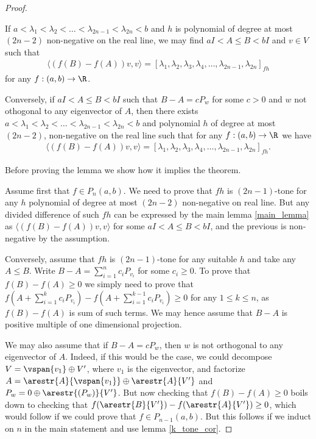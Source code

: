 \begin{proof}
	\begin{lem}\label{main_lemma}
		If $a < \lambda_{1} < \lambda_{2} < \ldots < \lambda_{2 n - 1} < \lambda_{2 n} < b$ and $h$ is polynomial of degree at most $(2 n - 2)$ non-negative on the real line, we may find $a I < A \leq  B < b I$ and $v \in V$ such that
		\begin{align*}
			\langle (f(B) - f(A)) v, v \rangle = [\lambda_{1}, \lambda_{2}, \lambda_{3}, \lambda_{4}, \ldots, \lambda_{2n - 1}, \lambda_{2 n}]_{f h}
		\end{align*}
		for any $f : (a, b) \to \R$.

		Conversely, if $a I < A \leq B < b I$ such that $B - A = c P_{w}$ for some $c > 0$ and $w$ not othogonal to any eigenvector of $A$, then there exists $a < \lambda_{1} < \lambda_{2} < \ldots < \lambda_{2 n - 1} < \lambda_{2 n} < b$ and polynomial $h$ of degree at most $(2 n - 2)$, non-negative on the real line such that for any $f : (a, b) \to \R$ we have
		\begin{align*}
			\langle (f(B) - f(A)) v, v \rangle = [\lambda_{1}, \lambda_{2}, \lambda_{3}, \lambda_{4}, \ldots, \lambda_{2n - 1}, \lambda_{2 n}]_{f h}.
		\end{align*}
	\end{lem}

	Before proving the lemma we show how it implies the theorem.

	Assume first that $f \in P_{n}(a, b)$. We need to prove that $f h$ is $(2 n - 1)$-tone for any $h$ polynomial of degree at most $(2 n - 2)$ non-negative on real line. But any divided difference of such $f h$ can be expressed by the main lemma \ref{main_lemma} as $\langle (f(B) - f(A)) v, v \rangle$ for some $aI < A \leq B < bI$, and the previous is non-negative by the assumption.

	Conversely, assume that $f h$ is $(2 n - 1)$-tone for any suitable $h$ and take any $A \leq B$. Write $B - A = \sum_{i = 1}^{n} c_{i} P_{v_{i}}$ for some $c_{i} \geq 0$. To prove that $f(B) - f(A) \geq 0$ we simply need to prove that $f(A + \sum_{i = 1}^{k} c_{i} P_{v_{i}}) - f(A + \sum_{i = 1}^{k - 1} c_{i} P_{v_{i}}) \geq 0$ for any $1 \leq k \leq n$, as $f(B) - f(A)$ is sum of such terms. We may hence assume that $B - A$ is positive multiple of one dimensional projection.

	We may also assume that if $B - A = c P_{w}$, then $w$ is not orthogonal to any eigenvector of $A$. Indeed, if this would be the case, we could decompose $V = \vspan\{v_{1}\} \oplus V'$, where $v_{1}$ is the eigenvector, and factorize $A = \arestr{A}{\vspan\{v_{1}\}} \oplus \arestr{A}{V'}$ and $P_{w} = 0 \oplus \arestr{(P_{w})}{V'}$. But now checking that $f(B) - f(A) \geq 0$ boils down to checking that $f(\arestr{B}{V'}) - f(\arestr{A}{V'}) \geq 0$, which would follow if we could prove that $f \in P_{n - 1}(a, b)$. But this follows if we induct on $n$ in the main statement and use lemma \ref{k_tone_cor}.


\end{proof}
